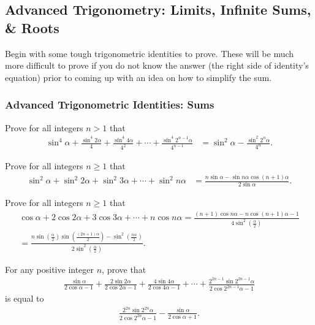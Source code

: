 \subsection{Advanced Trigonometry: Limits, Infinite Sums, \& Roots}
Begin with some tough trigonometric identities to prove. These will be much more difficult to prove if you do not know the answer (the right side of identity's equation) prior to coming up with an idea on how to simplify the sum.

\subsubsection{Advanced Trigonometric Identities: Sums}

\begin{question}
    Prove for all integers $n>1$ that
    \begin{align*}
        \sin^4\alpha + \frac{\sin^4 2\alpha}{4}+\frac{\sin^4 4\alpha}{4^2} + \cdots + \frac{\sin^4 2^{n-1}\alpha}{4^{n-1}} &= \sin^2\alpha - \frac{\sin^2 2^n\alpha}{4^n}.
    \end{align*}
\end{question}


\begin{question}
    Prove for all integers $n\geq 1$ that
    \begin{align*}
        \sin^2\alpha + \sin^2 2\alpha + \sin^2 3\alpha + \cdots + \sin^2 n\alpha &= \frac{n\sin \alpha - \sin n\alpha \cos (n+1)\alpha}{2\sin\alpha}.
    \end{align*}
\end{question}


\begin{question}
    Prove for all integers $n\geq 1$ that
    \begin{multline*}
        \cos\alpha + 2\cos 2\alpha + 3\cos 3\alpha + \cdots + n\cos n\alpha = \frac{(n+1)\cos n\alpha - n\cos(n+1)\alpha - 1}{\displaystyle 4\sin^2\left(\frac{\alpha}{2}\right)}\\
        = \frac{\displaystyle n\sin\left(\frac{\alpha}{2}\right)\sin\left(\frac{(2n+1)\alpha}{2}\right) - \sin^2\left(\frac{n\alpha}{2}\right)}{\displaystyle 2\sin^2\left(\frac{\alpha}{2}\right)}.
    \end{multline*}
\end{question}


\begin{question}
    For any positive integer $n$, prove that
    \begin{align*}
        \frac{\sin\alpha}{2\cos\alpha-1} + \frac{2\sin 2\alpha}{2\cos 2\alpha -1} + \frac{4\sin 4\alpha}{2\cos 4\alpha - 1} + \cdots + \frac{2^{2n-1}\sin 2^{2n-1}\alpha}{2\cos 2^{2n-1}\alpha - 1}
    \end{align*}
    is equal to
    \begin{align*}
        \frac{2^{2n}\sin 2^{2n}\alpha}{2\cos 2^{2n}\alpha - 1} - \frac{\sin \alpha}{2\cos \alpha + 1}.
    \end{align*}
\end{question}

